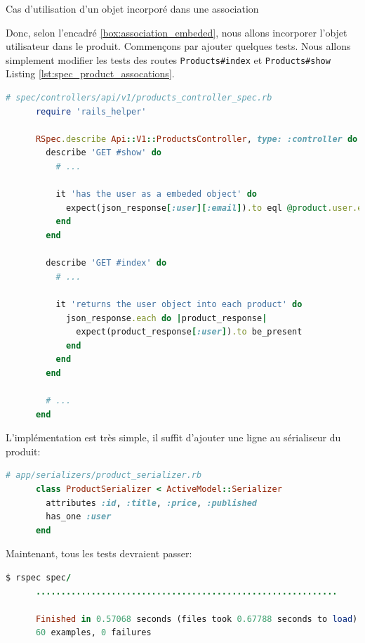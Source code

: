 \documentclass[]{report}
\begin{document}
\begin{tcolorbox}{Cas d'utilisation d'un objet incorporé dans une association}
    \end{tcolorbox}

    Donc, selon l'encadré \ref{box:association_embeded}, nous allons incorporer l'objet utilisateur dans le produit. Commençons par ajouter quelques tests. Nous allons simplement modifier les tests des routes \verb|Products#index| et \verb|Products#show| Listing \ref{lst:spec_product_assocations}.

    \begin{scriptsize}
      \begin{lstlisting}[language=ruby, caption={Test de l'associations des produits pour l'API}, label={lst:spec_product_assocations}]
      # spec/controllers/api/v1/products_controller_spec.rb
      require 'rails_helper'

      RSpec.describe Api::V1::ProductsController, type: :controller do
        describe 'GET #show' do
          # ...

          it 'has the user as a embeded object' do
            expect(json_response[:user][:email]).to eql @product.user.email
          end
        end

        describe 'GET #index' do
          # ...

          it 'returns the user object into each product' do
            json_response.each do |product_response|
              expect(product_response[:user]).to be_present
            end
          end
        end

        # ...
      end
      \end{lstlisting}
    \end{scriptsize}

    L'implémentation est très simple, il suffit d'ajouter une ligne au sérialiseur du produit:

    \begin{scriptsize}
      \begin{lstlisting}[language=ruby]
      # app/serializers/product_serializer.rb
      class ProductSerializer < ActiveModel::Serializer
        attributes :id, :title, :price, :published
        has_one :user
      end
      \end{lstlisting}
    \end{scriptsize}

    Maintenant, tous les tests devraient passer:

    \begin{scriptsize}
      \begin{lstlisting}[language=ruby]
      $ rspec spec/
      ............................................................

      Finished in 0.57068 seconds (files took 0.67788 seconds to load)
      60 examples, 0 failures
      \end{lstlisting}
    \end{scriptsize}
\end{document}
